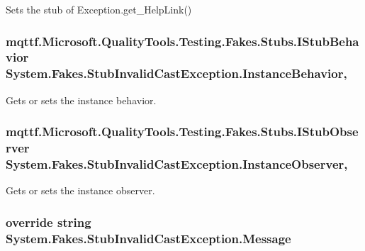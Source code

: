 Sets the stub of Exception.\-get\-\_\-\-Help\-Link()

\hypertarget{class_system_1_1_fakes_1_1_stub_invalid_cast_exception_aeaad6f768237a4a93beddf84af549b94}{
\subsubsection[{Instance\-Behavior}]{\setlength{\rightskip}{0pt plus 5cm}mqttf.\-Microsoft.\-Quality\-Tools.\-Testing.\-Fakes.\-Stubs.\-I\-Stub\-Behavior System.\-Fakes.\-Stub\-Invalid\-Cast\-Exception.\-Instance\-Behavior\hspace{0.3cm}{\ttfamily [get]}, {\ttfamily [set]}}}\label{class_system_1_1_fakes_1_1_stub_invalid_cast_exception_aeaad6f768237a4a93beddf84af549b94}


Gets or sets the instance behavior.

\hypertarget{class_system_1_1_fakes_1_1_stub_invalid_cast_exception_a2bcb7ce6100897382bc34a3cc57b2b4f}{
\subsubsection[{Instance\-Observer}]{\setlength{\rightskip}{0pt plus 5cm}mqttf.\-Microsoft.\-Quality\-Tools.\-Testing.\-Fakes.\-Stubs.\-I\-Stub\-Observer System.\-Fakes.\-Stub\-Invalid\-Cast\-Exception.\-Instance\-Observer\hspace{0.3cm}{\ttfamily [get]}, {\ttfamily [set]}}}\label{class_system_1_1_fakes_1_1_stub_invalid_cast_exception_a2bcb7ce6100897382bc34a3cc57b2b4f}


Gets or sets the instance observer.

\hypertarget{class_system_1_1_fakes_1_1_stub_invalid_cast_exception_a88c6abb4c17a40240c80f648facbbc81}{
\subsubsection[{Message}]{\setlength{\rightskip}{0pt plus 5cm}override string System.\-Fakes.\-Stub\-Invalid\-Cast\-Exception.\-Message\hspace{0.3cm}{\ttfamily [get]}}}\label{class_system_1_1_fakes_1_1_stub_invalid_cast_exception_a88c6abb4c17a40240c80f648facbbc81}


